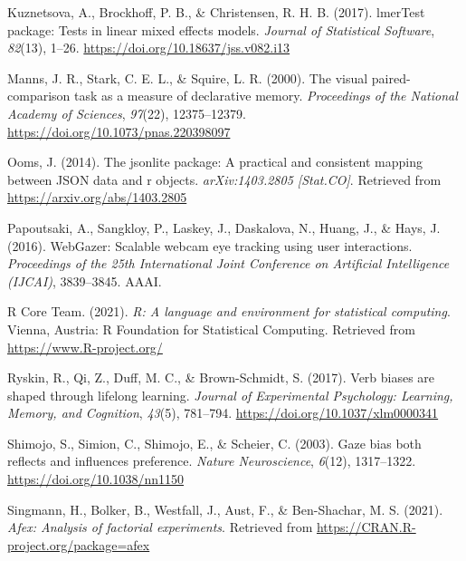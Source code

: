 \documentclass[
  man,floatsintext]{apa6}
\newlength{\cslhangindent}
\newlength{\cslentryspacingunit} %
\newenvironment{CSLReferences}[2] %
 {%
  \setlength{\parindent}{0pt}
  \ifodd #1
  \let\oldpar\par
  \def\par{\hangindent=\cslhangindent\oldpar}
  \fi
  \setlength{\parskip}{#2\cslentryspacingunit}
 }%
 {}
\begin{document}
\begin{CSLReferences}{1}{0}
\leavevmode{}%
Kuznetsova, A., Brockhoff, P. B., \& Christensen, R. H. B. (2017). {lmerTest} package: Tests in linear mixed effects models. \emph{Journal of Statistical Software}, \emph{82}(13), 1--26. \url{https://doi.org/10.18637/jss.v082.i13}

\leavevmode{}%
Manns, J. R., Stark, C. E. L., \& Squire, L. R. (2000). The visual paired-comparison task as a measure of declarative memory. \emph{Proceedings of the National Academy of Sciences}, \emph{97}(22), 12375--12379. \url{https://doi.org/10.1073/pnas.220398097}

\leavevmode{}%
Ooms, J. (2014). The jsonlite package: A practical and consistent mapping between JSON data and r objects. \emph{arXiv:1403.2805 {[}Stat.CO{]}}. Retrieved from \url{https://arxiv.org/abs/1403.2805}

\leavevmode{}%
Papoutsaki, A., Sangkloy, P., Laskey, J., Daskalova, N., Huang, J., \& Hays, J. (2016). {WebGazer}: {Scalable} webcam eye tracking using user interactions. \emph{Proceedings of the 25th International Joint Conference on Artificial Intelligence ({IJCAI})}, 3839--3845. {AAAI}.

\leavevmode{}%
R Core Team. (2021). \emph{R: A language and environment for statistical computing}. Vienna, Austria: R Foundation for Statistical Computing. Retrieved from \url{https://www.R-project.org/}

\leavevmode{}%
Ryskin, R., Qi, Z., Duff, M. C., \& Brown-Schmidt, S. (2017). Verb biases are shaped through lifelong learning. \emph{Journal of Experimental Psychology: Learning, Memory, and Cognition}, \emph{43}(5), 781--794. \url{https://doi.org/10.1037/xlm0000341}

\leavevmode{}%
Shimojo, S., Simion, C., Shimojo, E., \& Scheier, C. (2003). Gaze bias both reflects and influences preference. \emph{Nature Neuroscience}, \emph{6}(12), 1317--1322. \url{https://doi.org/10.1038/nn1150}

\leavevmode{}%
Singmann, H., Bolker, B., Westfall, J., Aust, F., \& Ben-Shachar, M. S. (2021). \emph{Afex: Analysis of factorial experiments}. Retrieved from \url{https://CRAN.R-project.org/package=afex}


\end{CSLReferences}
\end{document}
